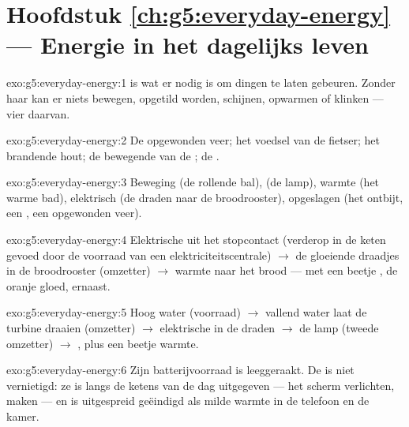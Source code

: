 \section*{Hoofdstuk \ref{ch:g5:everyday-energy} --- Energie in het dagelijks leven}

\begin{solution}{exo:g5:everyday-energy:1}
 is wat er nodig is om dingen te laten gebeuren. Zonder haar
kan er niets bewegen, opgetild worden, schijnen, opwarmen of
klinken --- vier daarvan.
\end{solution}

\begin{solution}{exo:g5:everyday-energy:2}
De opgewonden veer; het voedsel van de fietser; het brandende hout; de
bewegende  van de ; de .
\end{solution}

\begin{solution}{exo:g5:everyday-energy:3}
Beweging (de rollende bal),  (de lamp), warmte (het warme bad),
elektrisch (de draden naar de broodrooster), opgeslagen (het ontbijt,
een , een opgewonden veer).
\end{solution}

\begin{solution}{exo:g5:everyday-energy:4}
Elektrische  uit het stopcontact (verderop in de keten gevoed
door de voorraad van een elektriciteitscentrale) $\to$ de gloeiende
draadjes in de broodrooster (omzetter) $\to$ warmte naar het brood ---
met een beetje , de oranje gloed, ernaast.
\end{solution}

\begin{solution}{exo:g5:everyday-energy:5}
Hoog water (voorraad) $\to$ vallend water laat de turbine draaien
(omzetter) $\to$ elektrische  in de draden $\to$ de lamp
(tweede omzetter) $\to$ , plus een beetje warmte.
\end{solution}

\begin{solution}{exo:g5:everyday-energy:6}
Zijn batterijvoorraad is leeggeraakt. De  is niet vernietigd:
ze is langs de ketens van de dag uitgegeven --- het scherm verlichten,
 maken --- en is uitgespreid geëindigd als milde warmte in de
telefoon en de kamer.
\end{solution}

